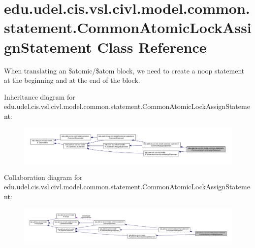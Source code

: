 \hypertarget{classedu_1_1udel_1_1cis_1_1vsl_1_1civl_1_1model_1_1common_1_1statement_1_1CommonAtomicLockAssignStatement}{}\section{edu.\+udel.\+cis.\+vsl.\+civl.\+model.\+common.\+statement.\+Common\+Atomic\+Lock\+Assign\+Statement Class Reference}
\label{classedu_1_1udel_1_1cis_1_1vsl_1_1civl_1_1model_1_1common_1_1statement_1_1CommonAtomicLockAssignStatement}


When translating an \$atomic/\$atom block, we need to create a noop statement at the beginning and at the end of the block.  




Inheritance diagram for edu.\+udel.\+cis.\+vsl.\+civl.\+model.\+common.\+statement.\+Common\+Atomic\+Lock\+Assign\+Statement\+:
\nopagebreak
\begin{figure}[H]
\begin{center}
\leavevmode
\includegraphics[width=350pt]{classedu_1_1udel_1_1cis_1_1vsl_1_1civl_1_1model_1_1common_1_1statement_1_1CommonAtomicLockAssignStatement__inherit__graph}
\end{center}
\end{figure}


Collaboration diagram for edu.\+udel.\+cis.\+vsl.\+civl.\+model.\+common.\+statement.\+Common\+Atomic\+Lock\+Assign\+Statement\+:
\nopagebreak
\begin{figure}[H]
\begin{center}
\leavevmode
\includegraphics[width=350pt]{classedu_1_1udel_1_1cis_1_1vsl_1_1civl_1_1model_1_1common_1_1statement_1_1CommonAtomicLockAssignStatement__coll__graph}
\end{center}
\end{figure}
